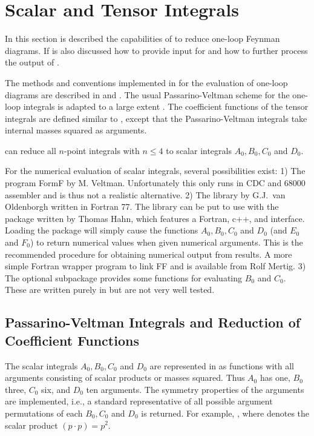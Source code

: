 \section{Scalar and Tensor Integrals}

In this section is described the capabilities of \fc to reduce one-loop Feynman diagrams. If is also discussed how to provide input for \fc and how to further process the output of \fc.

The methods and conventions implemented in \fc for the evaluation of one-loop diagrams are described in \cite{ansgar} and \cite{feyncalc}. The usual Passarino-Veltman scheme for the one-loop integrals is adapted to a large extent \cite{ansgar}.  The coefficient functions of the  tensor integrals are defined  similar to \cite{ansgar}, except that the Passarino-Veltman integrals take internal masses squared  as arguments.

\fc can reduce all $n$-point integrals with $n\leq 4$ to scalar integrals $A_0, B_0, C_0$ and $D_0$.

For the numerical evaluation of scalar integrals, several possibilities exist: 1) The program FormF by M. Veltman. Unfortunately this only runs in CDC and 68000 assembler and is thus not a realistic alternative. 2) The library \FF by G.J.~van Oldenborgh \cite{Ol91} written in Fortran 77. The library can be put to use with the \lpts package \cite{Hahn:1998yk} written by Thomas Hahn, which features a Fortran, c++, and \mma interface. Loading the \mma package will simply cause the functions $A_0, B_0, C_0$ and $D_0$ (and $E_0$ and $F_0$) to return numerical values when given numerical arguments. This is the recommended procedure for obtaining numerical output from \fc results. A more simple Fortran wrapper program to link FF and \fc is available from Rolf Mertig. 3) The optional subpackage \fphi provides some functions for evaluating $B_0$ and $C_0$. These are written purely in \mma but are not very well tested.

\subsection{Passarino-Veltman Integrals and Reduction of Coefficient Functions}
\label{passvelt}

The scalar integrals $A_0, B_0, C_0$ and $D_0$ are represented
in \fc as functions with all arguments consisting of scalar products or 
masses squared. Thus $A_0$ has one, $B_0$ three, $C_0$ six, and 
$D_0$ ten arguments. The symmetry properties of the arguments  are 
implemented, i.e., a standard representative of all possible 
argument permutations of each $ B_0, C_0$ and $D_0$ is returned.
For example,  \ra {}, where 
 denotes the scalar product $(p\cdot p) = p^2$.

